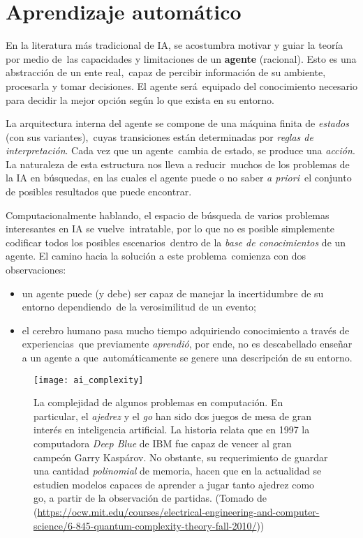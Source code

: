 \section{Aprendizaje automático}

\noindent
En la literatura más tradicional de IA, se acostumbra motivar y guiar la teoría por medio de\
las capacidades y limitaciones de un \textbf{agente} (racional). Esto es una abstracción de un ente real,\
capaz de percibir información de su ambiente, procesarla y tomar decisiones. El agente será\
equipado del conocimiento necesario para decidir la mejor opción según lo que exista en su entorno.\par
La arquitectura interna del agente se compone de una máquina finita de \emph{estados} (con sus variantes),\
cuyas transiciones están determinadas por \emph{reglas de interpretación}. Cada vez que un agente\
cambia de estado, se produce una \emph{acción}. La naturaleza de esta estructura nos lleva a reducir\
muchos de los problemas de la IA en búsquedas, en las cuales el agente puede o no saber \emph{a priori}\
el conjunto de posibles resultados que puede encontrar.\par
Computacionalmente hablando, el espacio de búsqueda de varios problemas interesantes en IA se vuelve\
intratable, por lo que no es posible simplemente codificar todos los posibles escenarios\
dentro de la \emph{base de conocimientos} de un agente. El camino hacia la solución a este problema\
comienza con dos observaciones:
\begin{itemize}
\item un agente puede (y debe) ser capaz de manejar la incertidumbre de su entorno dependiendo\
  de la verosimilitud de un evento;
\item el cerebro humano pasa mucho tiempo adquiriendo conocimiento a través de experiencias\
  que previamente \emph{aprendió}, por ende, no es descabellado enseñar a un agente a que\
  automáticamente se genere una descripción de su entorno.
\end{itemize}

\begin{figure}[H]
  \centering
  \texttt{[image: ai\_complexity]}
  \caption{La complejidad de algunos problemas en computación. En particular, el \emph{ajedrez}
    y el \emph{go} han sido dos juegos de mesa de gran interés en inteligencia artificial. La historia
    relata que en 1997 la computadora \emph{Deep Blue} de IBM fue capaz de vencer al gran campeón Garry Kaspárov.
    No obstante, su requerimiento de guardar una cantidad \emph{polinomial} de memoria, hacen que en la
    actualidad se estudien modelos capaces de aprender a jugar tanto ajedrez como go, a partir de la observación de partidas.
    (Tomado de (\url{https://ocw.mit.edu/courses/electrical-engineering-and-computer-science/6-845-quantum-complexity-theory-fall-2010/}))}
\end{figure}


